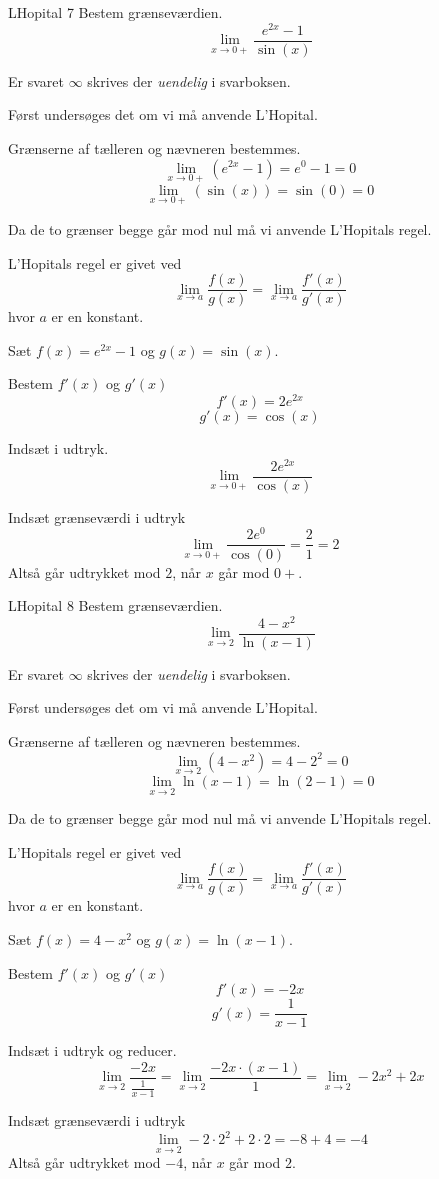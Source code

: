 \documentclass{article}
\begin{document}
\begin{exercise}{LHopital 7}
Bestem grænseværdien.
\[
\lim_{x \to 0+} \frac{e^{2x} - 1}{\sin(x)}
\]

Er svaret $\infty$ skrives der \emph{uendelig} i svarboksen.


\hint
Først undersøges det om vi må anvende L'Hopital.

\hint
Grænserne af tælleren og nævneren bestemmes.
\[
\lim_{x \to 0+} (e^{2x} - 1) = e^{0} - 1 = 0
\]
\[
\lim_{x \to 0+} (\sin(x)) = \sin(0) = 0
\]

\hint
Da de to grænser begge går mod nul må vi anvende L'Hopitals regel.

\hint
L'Hopitals regel er givet ved
\[
\lim_{x \to a} \frac{f(x)}{g(x)} = \lim_{x \to a} \frac{f'(x)}{g'(x)}
\]
hvor $a$ er en konstant.

\hint
Sæt $f(x) = e^{2x} - 1 $ og $g(x) = \sin(x)$.

\hint
Bestem $f'(x)$ og $g'(x)$
\[
f'(x) = 2 e^{2x}
\]
\[
g'(x) = \cos(x)
\]

\hint
Indsæt i udtryk.
\[
\lim_{x \to 0+} \frac{2 e^{2x}}{\cos(x)}
\]

\hint
Indsæt grænseværdi i udtryk
\[
\lim_{x \to 0+} \frac{2 e^{0}}{\cos(0)} = \frac{2}{1} = 2
\]
Altså går udtrykket mod $2$, når $x$ går mod $0 + $.

\end{exercise}

\begin{exercise}{LHopital 8}
Bestem grænseværdien.
\[
\lim_{x \to 2} \frac{4 - x^2}{\ln(x - 1)}
\]

Er svaret $\infty$ skrives der \emph{uendelig} i svarboksen.


\hint
Først undersøges det om vi må anvende L'Hopital.

\hint
Grænserne af tælleren og nævneren bestemmes.
\[
\lim_{x \to 2} (4 - x^2) = 4 - 2^2 = 0
\]
\[
\lim_{x \to 2} \ln(x - 1) = \ln(2 - 1) = 0
\]

\hint
Da de to grænser begge går mod nul må vi anvende L'Hopitals regel.

\hint
L'Hopitals regel er givet ved
\[
\lim_{x \to a} \frac{f(x)}{g(x)} = \lim_{x \to a} \frac{f'(x)}{g'(x)}
\]
hvor $a$ er en konstant.

\hint
Sæt $f(x) = 4 - x^2$ og $g(x) = \ln(x - 1)$.

\hint
Bestem $f'(x)$ og $g'(x)$
\[
f'(x) = -2 x
\]
\[
g'(x) = \frac{1}{x - 1}
\]

\hint
Indsæt i udtryk og reducer.
\[
\lim_{x \to 2} \frac{-2x}{\frac{1}{x - 1}} = \lim_{x \to 2} \frac{-2x \cdot (x - 1)}{1} = \lim_{x \to 2} -2x^2 + 2x
\]

\hint
Indsæt grænseværdi i udtryk
\[
\lim_{x \to 2} -2 \cdot 2^2 + 2 \cdot 2 = -8 + 4 = -4
\]
Altså går udtrykket mod $ -4$, når $x$ går mod $2$.

\end{exercise}
\end{document}
